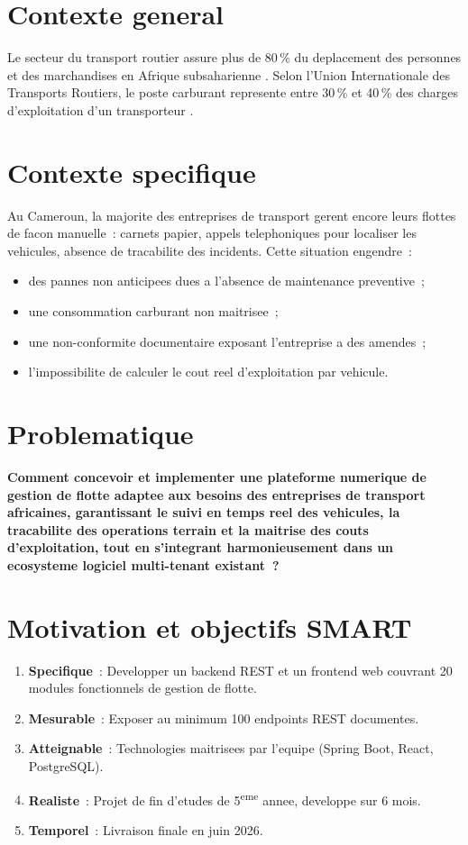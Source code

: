 \documentclass[12pt,a4paper]{report}
\begin{document}
\section*{Contexte general}
Le secteur du transport routier assure plus de 80\,\% du deplacement
des personnes et des marchandises en Afrique subsaharienne
\autocite{afdb2022transport}.
Selon l'Union Internationale des Transports Routiers, le poste carburant
represente entre 30\,\% et 40\,\% des charges d'exploitation
d'un transporteur \autocite{iru2023costs}.

\section*{Contexte specifique}
Au Cameroun, la majorite des entreprises de transport gerent encore leurs
flottes de facon manuelle~: carnets papier, appels telephoniques pour
localiser les vehicules, absence de tracabilite des incidents.
Cette situation engendre~:
\begin{itemize}[leftmargin=2cm]
  \item des pannes non anticipees dues a l'absence de maintenance preventive~;
  \item une consommation carburant non maitrisee~;
  \item une non-conformite documentaire exposant l'entreprise a des amendes~;
  \item l'impossibilite de calculer le cout reel d'exploitation par vehicule.
\end{itemize}

\section*{Problematique}
\textbf{Comment concevoir et implementer une plateforme numerique de gestion
de flotte adaptee aux besoins des entreprises de transport africaines,
garantissant le suivi en temps reel des vehicules, la tracabilite des
operations terrain et la maitrise des couts d'exploitation, tout en
s'integrant harmonieusement dans un ecosysteme logiciel multi-tenant
existant~?}

\section*{Motivation et objectifs SMART}
\begin{enumerate}[leftmargin=2cm]
  \item \textbf{Specifique}~: Developper un backend REST et un frontend web
        couvrant 20 modules fonctionnels de gestion de flotte.
  \item \textbf{Mesurable}~: Exposer au minimum 100 endpoints REST documentes.
  \item \textbf{Atteignable}~: Technologies maitrisees par l'equipe
        (Spring Boot, React, PostgreSQL).
  \item \textbf{Realiste}~: Projet de fin d'etudes de 5\textsuperscript{eme}
        annee, developpe sur 6 mois.
  \item \textbf{Temporel}~: Livraison finale en juin 2026.
\end{enumerate}
\end{document}
